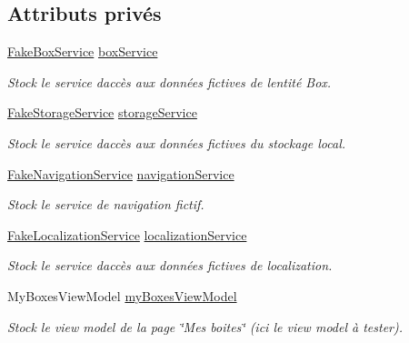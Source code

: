 \subsection*{Attributs privés}
\begin{DoxyCompactItemize}
\item 
\hyperlink{class_boxes_1_1_tests_1_1_mock_1_1_services_1_1_fake_box_service}{Fake\+Box\+Service} \hyperlink{class_boxes_1_1_tests_1_1_my_boxes_view_model_tests_a443c4249c89639c31c192682af92f0ba}{box\+Service}
\begin{DoxyCompactList}\small\item\em Stock le service d\textquotesingle{}accès aux données fictives de l\textquotesingle{}entité Box. \end{DoxyCompactList}\item 
\hyperlink{class_boxes_1_1_tests_1_1_mock_1_1_services_1_1_fake_storage_service}{Fake\+Storage\+Service} \hyperlink{class_boxes_1_1_tests_1_1_my_boxes_view_model_tests_ae40d71ffaa1877f7fa67e26f7e614574}{storage\+Service}
\begin{DoxyCompactList}\small\item\em Stock le service d\textquotesingle{}accès aux données fictives du stockage local. \end{DoxyCompactList}\item 
\hyperlink{class_boxes_1_1_tests_1_1_mock_1_1_services_1_1_fake_navigation_service}{Fake\+Navigation\+Service} \hyperlink{class_boxes_1_1_tests_1_1_my_boxes_view_model_tests_ac449bb0eac8ed5186bfc16f850b20e38}{navigation\+Service}
\begin{DoxyCompactList}\small\item\em Stock le service de navigation fictif. \end{DoxyCompactList}\item 
\hyperlink{class_boxes_1_1_tests_1_1_mock_1_1_services_1_1_fake_localization_service}{Fake\+Localization\+Service} \hyperlink{class_boxes_1_1_tests_1_1_my_boxes_view_model_tests_ab502aba1a3896e8d7becc071c0a1f509}{localization\+Service}
\begin{DoxyCompactList}\small\item\em Stock le service d\textquotesingle{}accès aux données fictives de localization. \end{DoxyCompactList}\item 
My\+Boxes\+View\+Model \hyperlink{class_boxes_1_1_tests_1_1_my_boxes_view_model_tests_aa0969607b266c750cd1edc2c33e26ed5}{my\+Boxes\+View\+Model}
\begin{DoxyCompactList}\small\item\em Stock le view model de la page \char`\"{}\+Mes boites\char`\"{} (ici le view model à tester). \end{DoxyCompactList}\end{DoxyCompactItemize}
